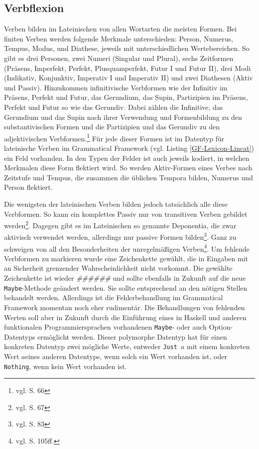 \subsection{Verbflexion}
\label{subsec:verb}
Verben bilden im Lateinischen von allen Wortarten die meisten Formen. Bei finiten Verben werden folgende Merkmale unterschieden: Person, Numerus, Tempus, Modus, und Diathese, jeweils mit unterschiedlichen Wertebereichen. So gibt es drei Personen, zwei Numeri (Singular und Plural), sechs Zeitformen (Präsens, Imperfekt, Perfekt, Plusquamperfekt, Futur I und Futur II), drei Modi (Indikativ, Konjunktiv, Imperativ I und Imperativ II) und zwei Diathesen (Aktiv und Passiv). Hinzukommen infinitivische Verbformen wie der Infinitiv im Präsens, Perfekt und Futur, das Gerundium, das Supin, Partizipien im Präsens, Perfekt und Futur so wie das Gerundiv. Dabei zählen die Infinitive, das Gerundium und das Supin nach ihrer Verwendung und Formenbildung zu den substantivischen Formen und die Partizipien und das Gerundiv zu den adjektivischen Verbformen.\footnote{vgl. \cite{BAYER-LINDAUER1994} S. 66} Für jede dieser Formen ist im Datentyp für lateinische Verben im Grammatical Framework (vgl. Listing \ref{GF-Lexicon-Lincat}) ein Feld vorhanden. In den Typen der Felder ist auch jeweils kodiert, in welchen Merkmalen diese Form flektiert wird. So werden Aktiv-Formen eines Verbes nach Zeitstufe und Tempus, die zusammen die üblichen Tempora bilden, Numerus und Person flektiert.  \par
Die wenigsten der lateinischen Verben bilden jedoch tatsächlich alle diese Verbformen. So kann ein komplettes Passiv nur von transitiven Verben gebildet werden\footnote{vgl. \cite{BAYER-LINDAUER1994} S. 67}. Dagegen gibt es im Lateinischen so genannte Deponentia, die zwar aktivisch verwendet werden, allerdings nur passive Formen bilden\footnote{vgl. \cite{BAYER-LINDAUER1994} S. 83}. Ganz zu schweigen von all den Besonderheiten der unregelmäßigen Verben\footnote{vgl. \cite{BAYER-LINDAUER1994} S. 105ff.}. Um fehlende Verbformen zu markieren wurde eine Zeichenkette gewählt, die in Eingaben mit an Sicherheit grenzender Wahrscheinlichkeit nicht vorkommt. Die gewählte Zeichenkette ist wieder \textit{\#\#\#\#\#\#} und sollte ebenfalls in Zukunft auf die neue \texttt{Maybe}-Methode geändert werden. Sie sollte entsprechend an den nötigen Stellen behandelt werden. Allerdings ist die Fehlerbehandlung im Grammatical Framework momentan noch eher rudimentär. Die Behandlungen von fehlenden Werten soll aber in Zukunft durch die Einführung eines in Haskell und anderen funktionalen Programmiersprachen vorhandenen \texttt{Maybe}- oder auch Option-Datentyps ermöglicht werden. Dieser polymorphe Datentyp hat für einen konkreten Datentyp zwei mögliche Werte, entweder \texttt{Just $a$} mit einem konkreten Wert \texttt{$a$}eines anderen Datentyps, wenn solch ein Wert vorhanden ist, oder \texttt{Nothing}, wenn kein Wert vorhanden ist.\par
